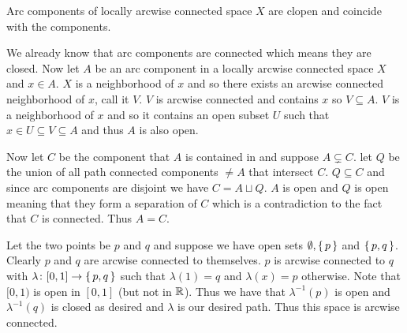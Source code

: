 \documentclass[letterpaper, 11pt, oneside]{book}
\begin{document}
\clearpage

\begin{prop}
  Arc components of locally arcwise connected space $X$ are clopen and coincide with the components.
\end{prop}
\begin{pf}
  We already know that arc components are connected which means they are closed.
  Now let $A$ be an arc component in a locally arcwise connected space $X$ and $x \in A$.
  $X$ is a neighborhood of $x$ and so there exists an arcwise connected neighborhood of $x$, call it $V$.
  $V$ is arcwise connected and contains $x$ so $V \subseteq A$.
  $V$ is a neighborhood of $x$ and so it contains an open subset $U$ such that $x \in U \subseteq V \subseteq A$ and thus $A$ is also open.

  Now let $C$ be the component that $A$ is contained in and suppose $A \subsetneq C$.
  let $Q$ be the union of all path connected components $\neq A$ that intersect $C$.
  $Q \subseteq C$ and since arc components are disjoint we have $C = A \sqcup Q$.
  $A$ is open and  $Q$ is open meaning that they form a separation of $C$ which is a contradiction to the fact that $C$ is connected.
  Thus $A = C$.
\end{pf}

\begin{ex}
  Let the two points be $p$ and $q$ and suppose we have open sets $\emptyset, \set{p}$ and $\set{p, q}$.
  Clearly $p$ and $q$ are arcwise connected to themselves.
  $p$ is arcwise connected to $q$ with $\lambda\colon [0, 1] \to \set{p, q}$ such that $\lambda(1) = q$ and $\lambda(x) = p$ otherwise.
  Note that $[0, 1)$ is open in $[0, 1]$ (but not in $\mathbb{R}$).
  Thus we have that $\lambda^{-1}(p)$ is open and $\lambda^{-1}(q)$ is closed as desired and $\lambda$ is our desired path.
  Thus this space is arcwise connected.
\end{ex}

\clearpage
\end{document}
